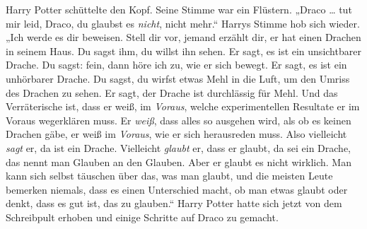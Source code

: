Harry Potter schüttelte den Kopf. Seine Stimme war ein Flüstern.
„Draco … tut mir leid, Draco, du glaubst es \emph{nicht}, nicht mehr.“ Harrys Stimme hob sich wieder.
„Ich werde es dir beweisen. Stell dir vor, jemand erzählt dir, er hat einen Drachen in seinem Haus. Du sagst ihm, du willst ihn sehen. Er sagt, es ist ein unsichtbarer Drache. Du sagst: fein, dann höre ich zu, wie er sich bewegt. Er sagt, es ist ein unhörbarer Drache. Du sagst, du wirfst etwas Mehl in die Luft, um den Umriss des Drachen zu sehen. Er sagt, der Drache ist durchlässig für Mehl. Und das Verräterische ist, dass er weiß, im \emph{Voraus}, welche experimentellen Resultate er im Voraus wegerklären muss. Er \emph{weiß}, dass alles so ausgehen wird, als ob es keinen Drachen gäbe, er weiß im \emph{Voraus}, wie er sich herausreden muss. Also vielleicht \emph{sagt} er, da ist ein Drache. Vielleicht \emph{glaubt} er, dass er glaubt, da sei ein Drache, das nennt man Glauben an den Glauben. Aber er glaubt es nicht wirklich. Man kann sich selbst täuschen über das, was man glaubt, und die meisten Leute bemerken niemals, dass es einen Unterschied macht, ob man etwas glaubt oder denkt, dass es gut ist, das zu glauben.“ Harry Potter hatte sich jetzt von dem Schreibpult erhoben und einige Schritte auf Draco zu gemacht.
